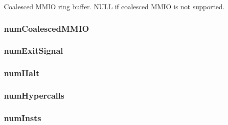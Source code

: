 \label{classBaseKvmCPU_ad4e1bcd3f032d2921aa97aec1fc7a45c}
Coalesced MMIO ring buffer. NULL if coalesced MMIO is not supported. \hypertarget{classBaseKvmCPU_a99a92abe3f29c3d0f59af4e384a8fe7f}{
\subsubsection[{numCoalescedMMIO}]{ {\bf numCoalescedMMIO}}}
\label{classBaseKvmCPU_a99a92abe3f29c3d0f59af4e384a8fe7f}
\hypertarget{classBaseKvmCPU_a6cdcd551476b4e8234d5bfd987218d88}{
\subsubsection[{numExitSignal}]{ {\bf numExitSignal}}}
\label{classBaseKvmCPU_a6cdcd551476b4e8234d5bfd987218d88}
\hypertarget{classBaseKvmCPU_a65e906b9e123036deb6bc8922ce53e96}{
\subsubsection[{numHalt}]{ {\bf numHalt}}}
\label{classBaseKvmCPU_a65e906b9e123036deb6bc8922ce53e96}
\hypertarget{classBaseKvmCPU_a230908c23db440bfcee954fb8d72f269}{
\subsubsection[{numHypercalls}]{ {\bf numHypercalls}}}
\label{classBaseKvmCPU_a230908c23db440bfcee954fb8d72f269}
\hypertarget{classBaseKvmCPU_a302bf9a6fd3b54c46eb3e2bfb18a320e}{
\subsubsection[{numInsts}]{ {\bf numInsts}}}
